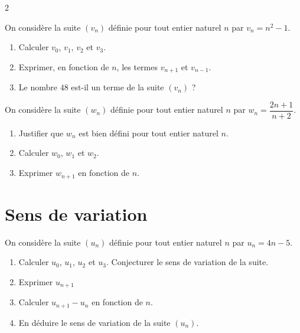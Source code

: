\documentclass[10pt,a4paper]{article}
\begin{document}
\begin{multicols}{2}
\begin{exo}[][]
On considère la suite \((v_n)\) définie pour tout entier naturel \(n\) par \(v_n = n^2-1\).

\begin{enumerate}[leftmargin=*]
    \item Calculer \(v_0\), \(v_1\), \(v_2\) et \(v_3\).
    \item Exprimer, en fonction de \(n\), les termes \(v_{n+1}\) et \(v_{n-1}\).
    \item Le nombre \(48\) est-il un terme de la suite \((v_n)\) ?
\end{enumerate}
\end{exo}

\begin{exo}[][appro]
On considère la suite \((w_n)\) définie pour tout entier naturel \(n\) par \(w_n = \dfrac{2n+1}{n+2}\).

\begin{enumerate}[leftmargin=*]
    \item Justifier que \(w_n\) est bien défini pour tout entier naturel \(n\).
    \item Calculer \(w_0\), \(w_1\) et \(w_2\).
    \item Exprimer \(w_{n+1}\) en fonction de \(n\).
\end{enumerate}
\end{exo}


\section{Sens de variation}

\begin{exo}[][]
On considère la suite \((u_n)\) définie pour tout entier naturel \(n\) par \(u_n = 4n-5\).

\begin{enumerate}[leftmargin=*]
    \item Calculer \(u_0\), \(u_1\), \(u_2\) et \(u_3\). Conjecturer le sens de variation de la suite.
    \item Exprimer \(u_{n+1}\)
    \item Calculer \(u_{n+1}-u_n\) en fonction de \(n\).
    \item En déduire le sens de variation de la suite \((u_n)\).
\end{enumerate}
\end{exo}


\end{multicols}
\end{document}
